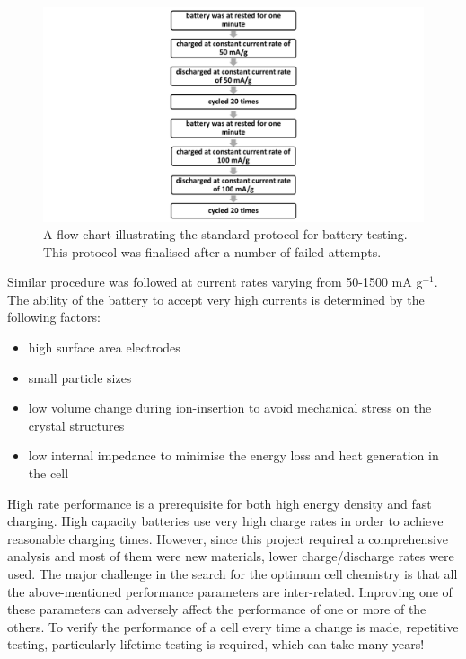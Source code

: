 \begin{figure}[tbh!]
\centering
\includegraphics[width=\textwidth]{Figures/chap3fig/flow.pdf}
\caption{A flow chart illustrating the standard protocol for battery testing. This protocol was finalised after a number of failed attempts.}
\label{Figures/chap3fig:flow}
\end{figure}

Similar procedure was followed at current rates varying from 50-1500 mA g$^{-1}$.\\
The ability of the battery to accept very high currents is determined by the following factors:
\begin{itemize}
    \item high surface area electrodes
    \item small particle sizes
    \item low volume change during ion-insertion to avoid mechanical stress on the crystal structures
    \item low internal impedance to minimise the energy loss and heat generation in the cell
\end{itemize}

High rate performance is a prerequisite for both high energy density and fast charging. High capacity batteries use very high charge rates in order to achieve reasonable charging times. However, since this project required a comprehensive analysis and most of them were new materials, lower charge/discharge rates were used. 
The major challenge in the search for the optimum cell chemistry is that all the above-mentioned performance parameters are inter-related. Improving one of these parameters can adversely affect the performance of one or more of the others. To verify the performance of a cell every time a change is made, repetitive testing, particularly lifetime testing is required, which can take many years! 






















